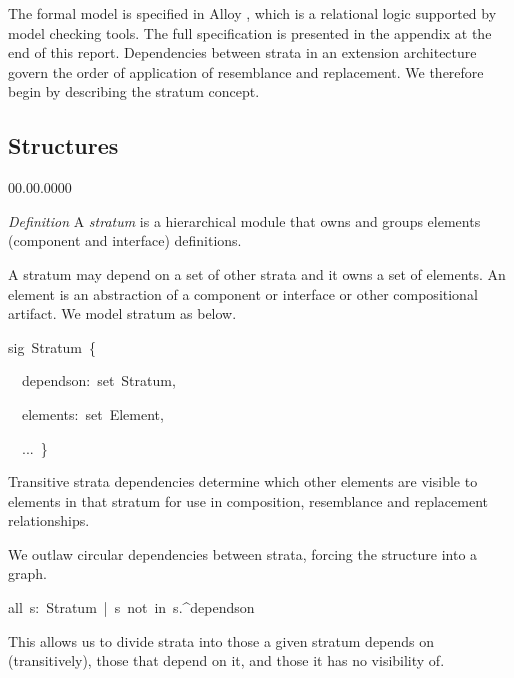 The formal model is specified in Alloy \cite{Jackson2006,Jackson2002},
which is a relational logic supported by model checking tools. The
full specification is presented in the appendix at the end of this
report. Dependencies between strata in an extension architecture govern
the order of application of resemblance and replacement. We therefore
begin by describing the stratum concept.


\subsection{Structures}
\begin{lyxlist}{00.00.0000}
\item [{\emph{Definition}}] A \emph{stratum} is a hierarchical module that
owns and groups elements (component and interface) definitions.
\end{lyxlist}
A stratum may depend on a set of other strata and it owns a set of
elements. An element is an abstraction of a component or interface
or other compositional artifact. We model stratum as below.
\begin{lyxcode}
{\footnotesize{}sig~Stratum~\{}{\footnotesize \par}

{\footnotesize{}~~dependson:~set~Stratum,}{\footnotesize \par}

{\footnotesize{}~~elements:~set~Element,}{\footnotesize \par}

{\footnotesize{}~~...~\}}{\footnotesize \par}
\end{lyxcode}
Transitive strata dependencies determine which other elements are
visible to elements in that stratum for use in composition, resemblance
and replacement relationships.

We outlaw circular dependencies between strata, forcing the structure
into a graph.
\begin{lyxcode}
{\footnotesize{}all~s:~Stratum~|~s~not~in~s.\textasciicircum{}dependson}{\footnotesize \par}
\end{lyxcode}
This allows us to divide strata into those a given stratum depends
on (transitively), those that depend on it, and those it has no visibility
of.

